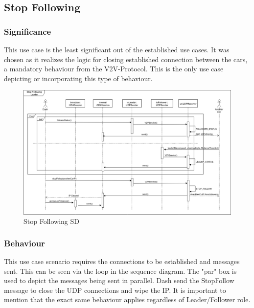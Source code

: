 \documentclass[12pt]{article}
\begin{document}
\subsection{Stop Following}
\subsubsection{Significance}
This use case is the least significant out of the established use cases. It was chosen as it realizes the logic for closing established connection between the cars, a mandatory behaviour from the V2V-Protocol. This is the only use case depicting or incorporating this type of behaviour.  
\FloatBarrier %
\begin{figure}[ht!]
\centering
\includegraphics[width=\linewidth]{Diagrams/StopFollowing.png}
\caption{Stop Following SD}
\label{fig:connectasleader}
\end{figure}
\FloatBarrier %

\subsubsection{Behaviour}
This use case scenario requires the connections to be established and messages sent. This can be seen via the loop in the sequence diagram. The "par" box is used to depict the messages being sent in parallel. Dash send the StopFollow message to close the UDP connections and wipe the IP. It is important to mention that the exact same behaviour applies regardless of Leader/Follower role.
\end{document}

